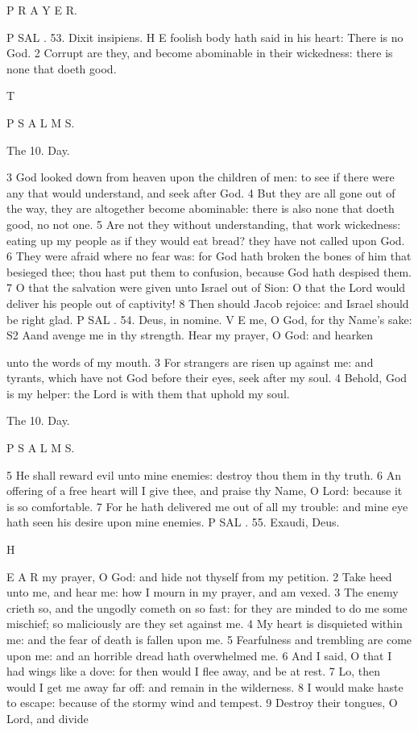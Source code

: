 P R A Y E R.

P SAL . 53. Dixit insipiens. H E foolish body hath said in his heart: There is no God. 2 Corrupt are they, and become abominable in their wickedness: there is none that doeth good.

T

P S A L M S.

The 10. Day.

3 God looked down from heaven upon the children of men: to see if there were any that would understand, and seek after God. 4 But they are all gone out of the way, they are altogether become abominable: there is also none that doeth good, no not one. 5 Are not they without understanding, that work wickedness: eating up my people as if they would eat bread? they have not called upon God. 6 They were afraid where no fear was: for God hath broken the bones of him that besieged thee; thou hast put them to confusion, because God hath despised them. 7 O that the salvation were given unto Israel out of Sion: O that the Lord would deliver his people out of captivity! 8 Then should Jacob rejoice: and Israel should be right glad. P SAL . 54. Deus, in nomine. V E me, O God, for thy Name’s sake: S2 Aand avenge me in thy strength. Hear my prayer, O God: and hearken

unto the words of my mouth. 3 For strangers are risen up against me: and tyrants, which have not God before their eyes, seek after my soul. 4 Behold, God is my helper: the Lord is with them that uphold my soul.

The 10. Day.

P S A L M S.

5 He shall reward evil unto mine enemies: destroy thou them in thy truth. 6 An offering of a free heart will I give thee, and praise thy Name, O Lord: because it is so comfortable. 7 For he hath delivered me out of all my trouble: and mine eye hath seen his desire upon mine enemies. P SAL . 55. Exaudi, Deus.

H

E A R my prayer, O God: and hide not thyself from my petition. 2 Take heed unto me, and hear me: how I mourn in my prayer, and am vexed. 3 The enemy crieth so, and the ungodly cometh on so fast: for they are minded to do me some mischief; so maliciously are they set against me. 4 My heart is disquieted within me: and the fear of death is fallen upon me. 5 Fearfulness and trembling are come upon me: and an horrible dread hath overwhelmed me. 6 And I said, O that I had wings like a dove: for then would I flee away, and be at rest. 7 Lo, then would I get me away far off: and remain in the wilderness. 8 I would make haste to escape: because of the stormy wind and tempest. 9 Destroy their tongues, O Lord, and divide

